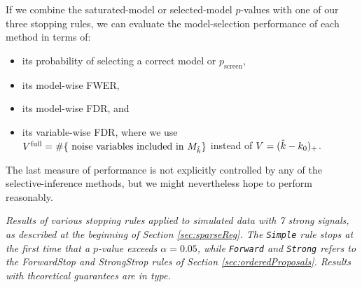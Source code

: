 \documentclass{article}
\begin{document}
If we combine the saturated-model or selected-model $p$-values with one of our three stopping rules, we can evaluate the model-selection performance of each method in terms of:
\begin{itemize}
\item its probability of selecting a correct model or $p_{\text{screen}}$,
\item its model-wise FWER,
\item its model-wise FDR, and
\item its variable-wise FDR, where we use $V^{\text{full}}= \#\{\text{ noise variables included in } M_{\hat{k}}\}$ instead of $V=(\hat{k}-k_0)_+$.
\end{itemize} 
The last measure of performance is not explicitly controlled by any of the selective-inference methods, but we might nevertheless hope to perform reasonably.


\begin{table}[ht]
\centering

\caption[tab:stopping]{\em Results of various stopping rules applied to simulated data with 7 strong signals,  as described at the beginning of Section \ref{sec:sparseReg}.
The {\tt Simple} rule stops at the first time that a $p$-value exceeds $\alpha=0.05$, while {\tt Forward} and {\tt Strong} refers to the ForwardStop and StrongStrop rules of Section \ref{sec:orderedProposals}. Results with theoretical guarantees are in  type.}
\label{tab:stopping05}
\end{table}
\end{document}
